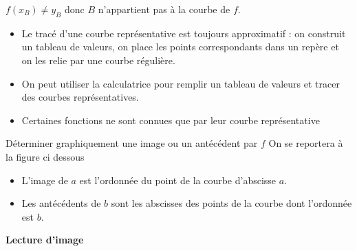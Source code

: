 \begin{pageCours}
\begin{Ex}
\begin{minipage}{0.5\linewidth}
$f(x_B)\neq y_B$ donc $B$ n'appartient pas à la courbe de $f$.  
\end{minipage}
\end{Ex}




\begin{Rqs}
\begin{itemize}
\item Le tracé d'une courbe représentative est toujours approximatif : on construit un tableau de valeurs, on place les points correspondants dans un repère et on les relie par une courbe régulière.
\item On peut utiliser la calculatrice pour remplir un tableau de valeurs et tracer des courbes représentatives. 
\item Certaines fonctions ne sont connues que par leur courbe représentative
\end{itemize}
\end{Rqs}




\begin{MtT}{Déterminer graphiquement une image ou un antécédent par $f$}
On se reportera à la figure ci dessous
\begin{itemize}
\item L'image de $a$ est l'ordonnée du point de la courbe d'abscisse $a$.
\item Les antécédents de $b$ sont les abscisses des points de la courbe dont l'ordonnée est $b$.
\end{itemize}

\begin{minipage}{0.48\linewidth}
\textbf{Lecture d'image}


\end{minipage}
\end{MtT}
\end{pageCours}
